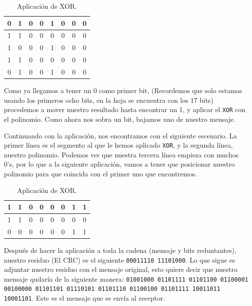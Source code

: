 \documentclass[spanish,12pt,letterpaper]{article}
\begin{document}
\begin{table}[H]
  \centering
  \begin{tabular}{| c | c | c | c | c | c | c | c |}\hline
    0 & 1 & 0 & 0 & 1 & 0 & 0 & 0 \\ \hline
    1 & 1 & 0 & 0 & 0 & 0 & 0 & 0 \\ \hline
    1 & 0 & 0 & 0 & 1 & 0 & 0 & 0 \\ \hline
    1 & 1 & 0 & 0 & 0 & 0 & 0 & 0 \\ \hline
    0 & 1 & 0 & 0 & 1 & 0 & 0 & 0 \\ \hline
  \end{tabular}
  \caption{Aplicación de XOR.}
\end{table}

Como ya llegamos a tener un 0 como primer bit, (Recordemos que solo estamos
usando los primeros ocho bits, en la hoja se encuentra con los 17 bits)
procedemos a mover nuestro resultado hasta encontrar un 1, y aplicar el
\texttt{XOR} con el polinomio. Como ahora nos sobra un bit, bajamos uno de
nuestro mensaje.

Continuando con la aplicación, nos encontramos con el siguiente escenario. La
primer línea es el segmento al que le hemos aplicado \texttt{XOR}, y la segunda
línea, nuestro polinomio. Podemos ver que nuestra tercera línea empieza con
muchos 0's, por lo que a la siguiente aplicación, vamos a tener que posicionar
nuestro polinomio para que coincida con el primer uno que encontremos.

\begin{table}[H]
  \centering
  \begin{tabular}{| c | c | c | c | c | c | c | c |}\hline
    1 & 1 & 0 & 0 & 0 & 0 & 1 & 1 \\ \hline
    1 & 1 & 0 & 0 & 0 & 0 & 0 & 0 \\ \hline
    0 & 0 & 0 & 0 & 0 & 0 & 1 & 1 \\ \hline
  \end{tabular}
  \caption{Aplicación de XOR.}
\end{table}

Después de hacer la aplicación a toda la cadena (mensaje y bits reduntantes),
nuestro residuo (El CRC) es el siguiente \texttt{00011110 11101000}. Lo que sigue
es adjuntar nuestro residuo con el mensaje original, esto quiere decir que
nuestro mensaje qudaría de la siguiente manera: \texttt{01001000 01101111
  01101100 01100001 00100000 01101101 01110101 01101110 01100100 01101111
  10011011 10001101}. Este es el mensaje que se envía al receptor.
\end{document}
